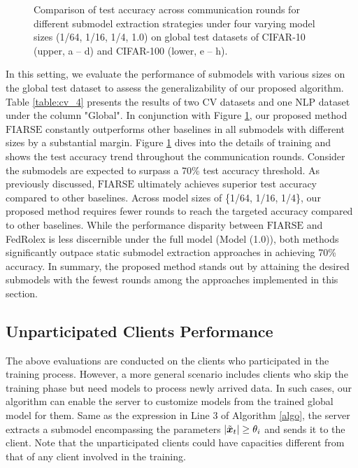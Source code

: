 \documentclass{article}
\theoremstyle{plain}
\theoremstyle{definition}
\theoremstyle{remark}
\newcommand{\algo}{\ensuremath{\text{FIARSE}}\xspace}
\begin{document}
\begin{figure}[t]
    \vspace{-5px}
    \caption{Comparison of test accuracy across communication rounds for different submodel extraction strategies under four varying model sizes (1/64, 1/16, 1/4, 1.0) on global test datasets of CIFAR-10 (upper, a -- d) and CIFAR-100 (lower, e -- h).}
    \label{fig:size_cifar10_4}
    \vspace{-15px}
\end{figure}

In this setting, we evaluate the performance of submodels with various sizes on the global test dataset to assess the generalizability of our proposed algorithm. Table \ref{table:cv_4} presents the results of two CV datasets and one NLP dataset under the column "Global". In conjunction with Figure \ref{fig:size_cifar10_4}, our proposed method \algo constantly outperforms other baselines in all submodels with different sizes by a substantial margin. Figure \ref{fig:size_cifar10_4} dives into the details of training and shows the test accuracy trend throughout the communication rounds. Consider the submodels are expected to surpass a 70\% test accuracy threshold.  As previously discussed, \algo ultimately achieves superior test accuracy compared to other baselines. Across model sizes of \{1/64, 1/16, 1/4\}, our proposed method requires fewer rounds to reach the targeted accuracy compared to other baselines. While the performance disparity between \algo and FedRolex is less discernible under the full model (Model (1.0)), both methods significantly outpace static submodel extraction approaches in achieving 70\% accuracy. In summary, the proposed method stands out by attaining the desired submodels with the fewest rounds among the approaches implemented in this section.


\subsection{Unparticipated Clients Performance}



The above evaluations are conducted on the clients who participated in the training process. However, a more general scenario includes clients who skip the training phase but need models to process newly arrived data. In such cases, our algorithm can enable the server to customize models from the trained global model for them. Same as the expression in Line 3 of Algorithm \ref{algo}, the server extracts a submodel encompassing the parameters $|\x{t}| \geq \theta_i$ and sends it to the client. Note that the unparticipated clients could have capacities different from that of any client involved in the training. 
\end{document}
